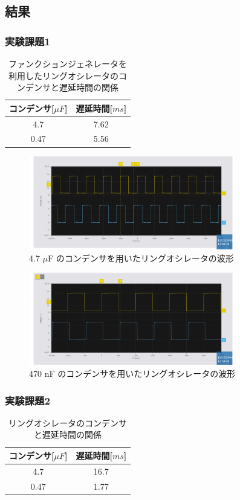 \documentclass{ltjsarticle}
\begin{document}
\subsection{結果}
\subsubsection{実験課題1}
\begin{table}[H]
\centering
\begin{tabular}{|c|c|}
\hline
コンデンサ[${\mu F}$] & 遅延時間[${ms}$] \\ \hline
4.7 & 7.62  \\ \hline
0.47 & 5.56 \\ \hline
\end{tabular}
\caption{ファンクションジェネレータを利用したリングオシレータのコンデンサと遅延時間の関係}
\label{tab:results}
\end{table}

\begin{figure}[H]
\centering
\includegraphics[width=0.8\textwidth]{figs/1-4700nF.png}
\caption{4.7 $\mu$F のコンデンサを用いたリングオシレータの波形}
\label{fig:experiment_results}
\end{figure}

\begin{figure}[H]
  \centering
  \includegraphics[width=0.8\textwidth]{figs/1-470mF.png}
  \caption{470 nF のコンデンサを用いたリングオシレータの波形}
  \label{fig:experiment_results}
  \end{figure}

\subsubsection{実験課題2}
\begin{table}[H]
  \centering
  \begin{tabular}{|c|c|}
  \hline
  コンデンサ[${\mu F}$] & 遅延時間[${ms}$] \\ \hline
  4.7 & 16.7  \\ \hline
  0.47 & 1.77 \\ \hline
  \end{tabular}
  \caption{リングオシレータのコンデンサと遅延時間の関係}
  \label{tab:results}
\end{table}
\end{document}
